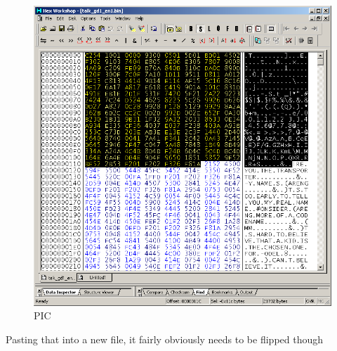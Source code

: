 \documentclass[
]{book}
\begin{document}
\begin{figure}
\centering
\includegraphics{images/101_home_fast6191_romhackingguide_unrenamed_fil___borders_romhackingguidepointersexamplehexw1.png}
\caption{PIC}
\end{figure}

Pasting that into a new file, it fairly obviously needs to be flipped though
\end{document}

